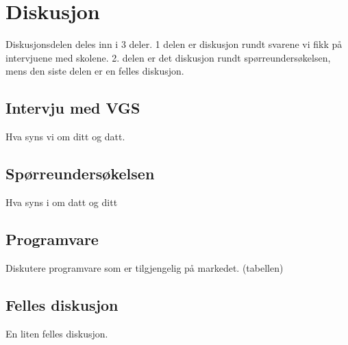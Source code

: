 \cleardoublepage
\chapter{Diskusjon}
\label{diskusjon} 

{\color {red} Diskusjonsdelen deles inn i 3 deler. 1 delen er diskusjon rundt svarene vi fikk på intervjuene med skolene. 2. delen er det diskusjon rundt spørreundersøkelsen, mens den siste delen er en felles diskusjon.}

\section{Intervju med VGS}
{\color {red} Hva syns vi om ditt og datt.}

\section {Spørreundersøkelsen}
{\color {red}  Hva syns i om datt og ditt}

\section {Programvare}
{\color {red} Diskutere programvare som er tilgjengelig på markedet. (tabellen)  }

\section {Felles diskusjon}
{\color {red}  En liten felles diskusjon.}

